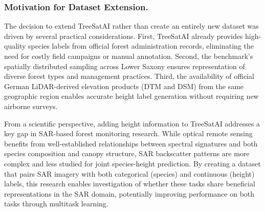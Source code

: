 \subsubsection{Motivation for Dataset Extension.}
The decision to extend TreeSatAI rather than create an entirely new dataset was driven by several practical considerations. First, TreeSatAI already provides high-quality species labels from official forest administration records, eliminating the need for costly field campaigns or manual annotation. Second, the benchmark's spatially distributed sampling across Lower Saxony ensures representation of diverse forest types and management practices. Third, the availability of official German LiDAR-derived elevation products (DTM and DSM) from the same geographic region enables accurate height label generation without requiring new airborne surveys.

From a scientific perspective, adding height information to TreeSatAI addresses a key gap in SAR-based forest monitoring research. While optical remote sensing benefits from well-established relationships between spectral signatures and both species composition and canopy structure, SAR backscatter patterns are more complex and less studied for joint species-height prediction. By creating a dataset that pairs SAR imagery with both categorical (species) and continuous (height) labels, this research enables investigation of whether these tasks share beneficial representations in the SAR domain, potentially improving performance on both tasks through multitask learning.
